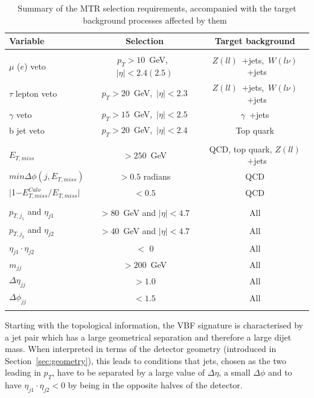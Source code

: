 \begin{table}[htbp]
\centering
\begin{tabular}{lcc}
    Variable                           & Selection                       & Target background \\
    \hline
    & & \\
    $\mu$ ($e$) veto               & $p_T > 10$~GeV,~$|\eta| < 2.4 (2.5)$  & $Z(ll)$~+jets,~$W(l\nu)$~+jets \\
    $\tau$ lepton veto                 & $p_T > 20$~GeV,~$|\eta| < 2.3$        & $Z(ll)$~+jets,~$W(l\nu)$~+jets  \\
    $\gamma$ veto                        & $p_T > 15$~GeV,~$|\eta| < 2.5$        & $\gamma$~+jets \\
    b jet veto                    &  $p_T > 20$~GeV,~$|\eta| < 2.4$  &  Top quark\\
        & & \\
    $E_{T,miss}$                          & ${>} 250$~GeV                          & QCD, top quark, $Z(ll)$~+jets \\
    $min\Delta\phi(j, E_{T,miss})$   &  $ {>} 0.5$ radians               & QCD \\
    $|$1$-E_{T,miss}^{Calo}/E_{T,miss}|$   &  $ {<} 0.5$               & QCD \\
        & & \\
    $p_{T,j_1}$ and $\eta_{j1}$   & ${>} 80$~GeV and $ |\eta| < 4.7$      & All \\
    $p_{T,j_2}$ and $\eta_{j2}$   & ${>} 40$~GeV and $ |\eta| < 4.7$      & All \\
    $\eta_{j1}\cdot\eta_{j2}$   & ${<}$ 0   & All \\

    $m_{jj}$                               & ${>} 200$~GeV & All \\       
    $\Delta\eta_{jj}$                            & ${>} 1.0$ & All \\
    $\Delta\phi_{jj}$                            & ${<} 1.5$ & All \\
        & & \\
         \hline
\end{tabular}
\caption{Summary of the MTR selection requirements, accompanied with the target background processes affected by them~\cite{note:AN_19_257}}
\label{tab:selection_mtr}
\end{table}

\hspace{10pt} Starting with the topological information, the VBF signature is characterised by a jet pair which has a large geometrical separation and therefore a large dijet mass. When interpreted in terms of the detector geometry (introduced in Section~\ref{sec:geometry}), this leads to conditions that jets, chosen as the two leading in $p_T$, have to be separated by a large value of $\Delta \eta$, a small $\Delta \phi$ and to have $\eta_{j1}\cdot\eta_{j2}<0$ by being in the opposite halves of the detector.

